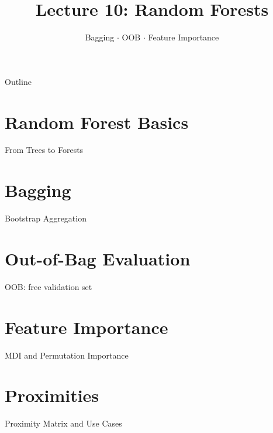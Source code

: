 \documentclass[aspectratio=169]{beamer}
\title{Lecture 10: Random Forests}
\subtitle{Bagging $\cdot$ OOB $\cdot$ Feature Importance}
\date{}
\begin{document}
\begin{frame}\titlepage\end{frame}

\begin{frame}{Outline}
  \tableofcontents
\end{frame}

\section{Random Forest Basics}
\begin{frame}{From Trees to Forests}
\end{frame}

\section{Bagging}
\begin{frame}{Bootstrap Aggregation}
\end{frame}

\section{Out-of-Bag Evaluation}
\begin{frame}{OOB: free validation set}
\end{frame}

\section{Feature Importance}
\begin{frame}{MDI and Permutation Importance}
\end{frame}

\section{Proximities}
\begin{frame}{Proximity Matrix and Use Cases}
\end{frame}
\end{document}
